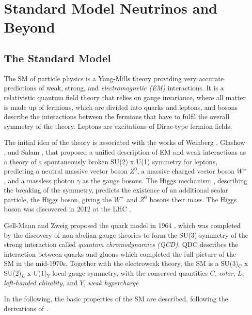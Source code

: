 \setchapterpreamble[u]{\margintoc}

\chapter{Standard Model Neutrinos and Beyond}


\section{The Standard Model}

The SM of particle physics is a Yang-Mills theory  providing very accurate predictions of weak, strong, and \textit{electromagnetic (EM)} interactions. It is a relativistic quantum field theory that relies on gauge invariance, where all matter is made up of fermions, which are divided into quarks and leptons, and bosons describe the interactions between the fermions that have to fulfil the overall symmetry of the theory. Leptons are excitations of Dirac-type fermion fields.

The initial idea of the theory is associated with the works of Weinberg , Glashow , and Salam \cite{Salam}, that proposed a unified description of EM and weak interactions as a theory of a spontaneously broken SU(2) x U(1) symmetry for leptons, predicting a neutral massive vector boson $Z^0$, a massive charged vector boson $W^\pm$, and a massless photon $\gamma$ as the gauge bosons. The Higgs mechanism , describing the breaking of the symmetry, predicts the existence of an additional scalar particle, the Higgs boson, giving the $W^\pm$ and $Z^0$ bosons their mass. The Higgs boson was discovered in 2012 at the LHC .

Gell-Mann and Zweig proposed the quark model in 1964 , which was completed by the discovery of non-abelian gauge theories \cite{non_abel_gauge} to form the SU(3) symmetry of the strong interaction called \textit{quantum chromodynamics (QCD)}. QDC describes the interaction between quarks and gluons which completed the full picture of the SM in the mid-1970s. Together with the electroweak theory, the SM is a SU(3)$_C$ x SU(2)$_L$ x U(1)$_Y$ local gauge symmetry, with the conserved quantities $C$, \textit{color}, $L$, \textit{left-handed chirality}, and $Y$, \textit{weak hypercharge}

In the following, the basic properties of the SM are described, following the derivations of .


